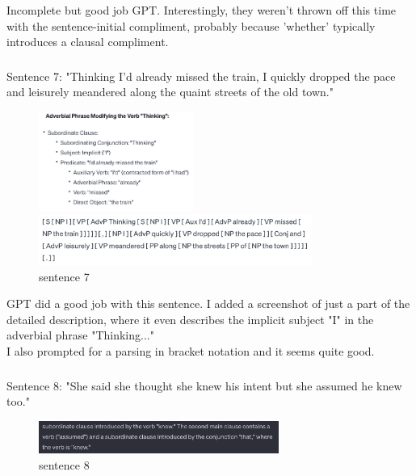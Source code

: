 \documentclass{article}
\begin{document}
Incomplete but good job GPT. Interestingly, they weren't thrown off this time with the sentence-initial compliment, probably because 'whether' typically introduces a clausal compliment.  
\\
\subsubsection{}	%
Sentence 7: "Thinking I'd already missed the train, I quickly dropped the pace and leisurely meandered along the quaint streets of the old town." \\
\begin{figure}[H]
  \centering

  \includegraphics[width=0.45\textwidth]{sen7a.png}

  \vspace{10pt} %

  \includegraphics[width=0.8\textwidth]{sen7b.png}

  \caption{sentence 7}
  \label{fig:overall}
\end{figure}


GPT did a good job with this sentence. I added a screenshot of just a part of the detailed description, where it even describes the implicit subject "I" in the adverbial phrase "Thinking..."  \\
I also prompted for a parsing in bracket notation and it seems quite good. \\

\subsubsection{}	%
Sentence 8: "She said she thought she knew his intent but she assumed he knew too." \\
\begin{figure}[H]
  \centering
  \includegraphics[width=0.7\textwidth]{sen8.png} 
  \caption{sentence 8}
\end{figure}
\end{document}
